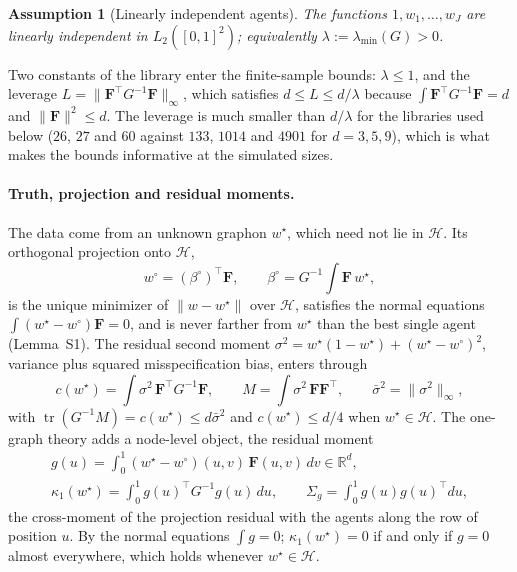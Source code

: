 \documentclass[12pt]{article}
\newtheorem{assumption}{Assumption}
\newcommand{\R}{\mathbb{R}}
\newcommand{\calH}{\mathcal{H}}
\newcommand{\tr}{\operatorname{tr}}
\newcommand{\supn}[1]{\|#1\|_{\infty}}
\newcommand{\norm}[1]{\|#1\|}
\newcommand{\wstar}{w^{\star}}
\newcommand{\wproj}{w^{\circ}}
\newcommand{\bproj}{\beta^{\circ}}
\newcommand{\Fv}{\mathbf{F}}
\begin{document}
\begin{assumption}[Linearly independent agents]
\label{ass:gram}
The functions $1,w_1,\dots,w_J$ are linearly independent in $L_2([0,1]^2)$; equivalently $\lambda:=\lambda_{\min}(G)>0$.
\end{assumption}

Two constants of the library enter the finite-sample bounds: $\lambda\le1$, and the leverage $L=\supn{\Fv^{\top}G^{-1}\Fv}$, which satisfies $d\le L\le d/\lambda$ because $\int\Fv^{\top}G^{-1}\Fv=d$ and $\norm{\Fv}^2\le d$. The leverage is much smaller than $d/\lambda$ for the libraries used below ($26$, $27$ and $60$ against $133$, $1014$ and $4901$ for $d=3,5,9$), which is what makes the bounds informative at the simulated sizes.

\paragraph{Truth, projection and residual moments.}
The data come from an unknown graphon $\wstar$, which need not lie in $\calH$. Its orthogonal projection onto $\calH$,
\[
\wproj=(\bproj)^{\top}\Fv,\qquad \bproj=G^{-1}\!\int\Fv\,\wstar,
\]
is the unique minimizer of $\norm{w-\wstar}$ over $\calH$, satisfies the normal equations $\int(\wstar-\wproj)\Fv=0$, and is never farther from $\wstar$ than the best single agent (Lemma~S1). The residual second moment $\sigma^2=\wstar(1-\wstar)+(\wstar-\wproj)^2$, variance plus squared misspecification bias, enters through
\[
c(\wstar)=\int\sigma^2\,\Fv^{\top}G^{-1}\Fv,\qquad M=\int\sigma^2\,\Fv\Fv^{\top},\qquad \bar\sigma^2=\supn{\sigma^2},
\]
with $\tr(G^{-1}M)=c(\wstar)\le d\bar\sigma^2$ and $c(\wstar)\le d/4$ when $\wstar\in\calH$. The one-graph theory adds a node-level object, the residual moment
\begin{equation}
\label{eq:g}
\begin{gathered}
g(u)=\int_0^1(\wstar-\wproj)(u,v)\,\Fv(u,v)\,dv\in\R^{d},\\[2pt]
\kappa_1(\wstar)=\int_0^1 g(u)^{\top}G^{-1}g(u)\,du,\qquad \Sigma_g=\int_0^1 g(u)g(u)^{\top}du,
\end{gathered}
\end{equation}
the cross-moment of the projection residual with the agents along the row of position $u$. By the normal equations $\int g=0$; $\kappa_1(\wstar)=0$ if and only if $g=0$ almost everywhere, which holds whenever $\wstar\in\calH$.
\end{document}
